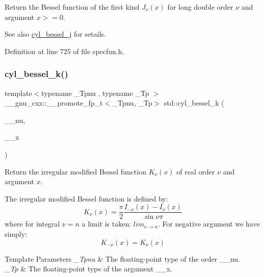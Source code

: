 Return the Bessel function of the first kind $ J_{\nu}(x) $ for {\ttfamily long double} order $ \nu $ and argument $ x >= 0 $.

\begin{DoxySeeAlso}{See also}
\hyperlink{group__tr29124__math__spec__func_ga968904e6095c70b275858f8e684403fb}{cyl\+\_\+bessel\+\_\+j} for setails. 
\end{DoxySeeAlso}


Definition at line 725 of file specfun.\+h.

\mbox{\label{group__tr29124__math__spec__func_ga3cd72edf8e8ef6f225d9c4a067f9423e}} 
\subsubsection{\texorpdfstring{cyl\+\_\+bessel\+\_\+k()}{cyl\_bessel\_k()}}
{\footnotesize\ttfamily template$<$typename \+\_\+\+Tpnu , typename \+\_\+\+Tp $>$ \\
\+\_\+\+\_\+gnu\+\_\+cxx\+::\+\_\+\+\_\+promote\+\_\+fp\+\_\+t$<$\+\_\+\+Tpnu, \+\_\+\+Tp$>$ std\+::cyl\+\_\+bessel\+\_\+k (\begin{DoxyParamCaption}\item[{\+\_\+\+Tpnu}]{\+\_\+\+\_\+nu,  }\item[{\+\_\+\+Tp}]{\+\_\+\+\_\+x }\end{DoxyParamCaption})\hspace{0.3cm}{\ttfamily [inline]}}

Return the irregular modified Bessel function $ K_{\nu}(x) $ of real order $ \nu $ and argument $ x $.

The irregular modified Bessel function is defined by\+: \[ K_{\nu}(x) = \frac{\pi}{2} \frac{I_{-\nu}(x) - I_{\nu}(x)}{\sin \nu\pi} \] where for integral $ \nu = n $ a limit is taken\+: $ lim_{\nu \to n} $. For negative argument we have simply\+: \[ K_{-\nu}(x) = K_{\nu}(x) \]


\begin{DoxyTemplParams}{Template Parameters}
{\em \+\_\+\+Tpnu} & The floating-\/point type of the order {\ttfamily \+\_\+\+\_\+nu}. \\
\hline
{\em \+\_\+\+Tp} & The floating-\/point type of the argument {\ttfamily \+\_\+\+\_\+x}. \\
\hline
\end{DoxyTemplParams}

